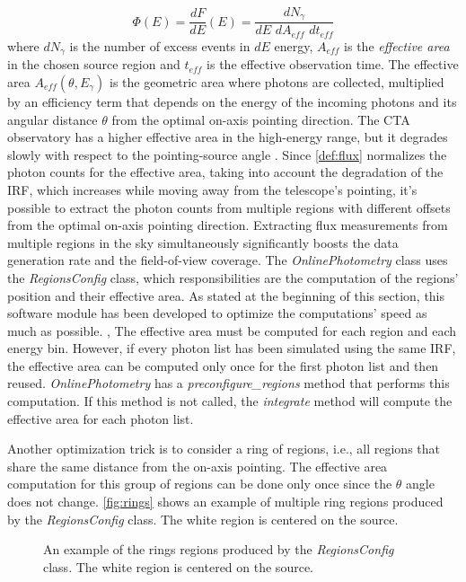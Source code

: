 \begin{equation} 
\Phi(E)=\frac{dF}{dE}(E)=\frac{dN_\gamma}{dE\,\,dA_{eff}\,\,dt_{eff}}
\end{equation}
where $dN_\gamma$ is the number of excess events in $dE$ energy, $A_{eff}$ is the \textit{effective area} in the chosen source region and $t_{eff}$ is the effective observation time. The effective area $A_{eff}(\theta,E_\gamma)$ is the geometric area where photons are collected, multiplied by an efficiency term that depends on the energy of the incoming photons and its angular distance $\theta$ from the optimal on-axis pointing direction. The CTA observatory has a higher effective area in the high-energy range, but it degrades slowly with respect to the pointing-source angle \cite{tampieri2020real}. Since  \autoref{def:flux} normalizes the photon counts for the effective area, taking into account the degradation of the IRF, which increases while moving away from the telescope's pointing, it's possible to extract the photon counts from multiple regions with different offsets from the optimal on-axis pointing direction. Extracting flux measurements from multiple regions in the sky simultaneously significantly boosts the data generation rate and the field-of-view coverage.
The \textit{OnlinePhotometry} class uses the \textit{RegionsConfig} class, which responsibilities are the computation of the regions' position and their effective area. As stated at the beginning of this section, this software module has been developed to optimize the computations' speed as much as possible. , The effective area must be computed for each region and each energy bin. However, if every photon list has been simulated using the same IRF, the effective area can be computed only once for the first photon list and then reused. \textit{OnlinePhotometry} has a \textit{preconfigure\_regions} method that performs this computation. If this method is not called, the \textit{integrate} method will compute the effective area for each photon list.

Another optimization trick is to consider a ring of regions, i.e., all regions that share the same distance from the on-axis pointing. The effective area computation for this group of regions can be done only once since the $\theta$ angle does not change. \autoref{fig:rings} shows an example of multiple ring regions produced by the \textit{RegionsConfig} class. The white region is centered on the source.
\begin{figure}[t]
\centering

\caption{An example of the rings regions produced by the \textit{RegionsConfig} class. The white region is centered on the source.}
\label{fig:rings}
\end{figure}


